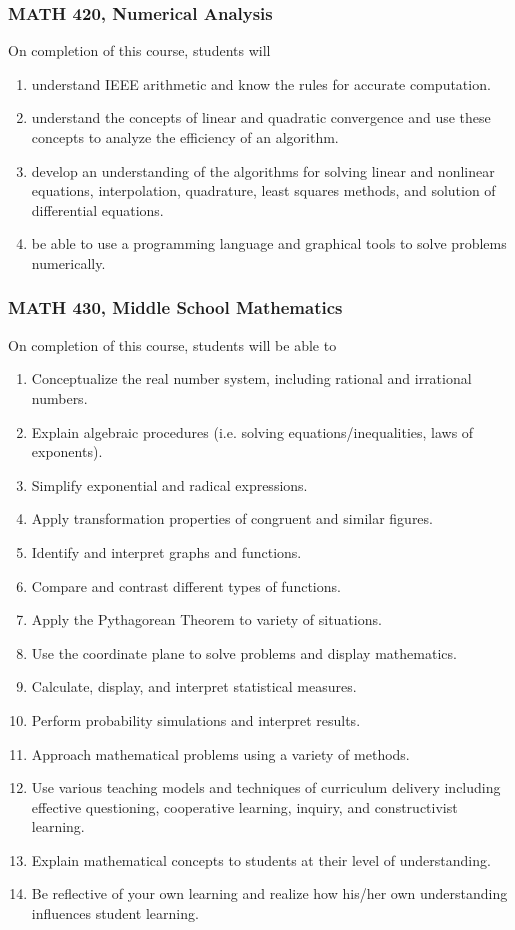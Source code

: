 \documentclass[11pt]{article}
\newenvironment{alphalist}{
\begin{enumerate}[label=(\arabic*),widest=107 ,leftmargin=25pt, itemsep=0pt]}
{\end{enumerate}}
\begin{document}
\subsubsection{MATH 420, Numerical Analysis}

On completion of this course, students will
\begin{alphalist}
    \item understand IEEE arithmetic and know the rules for accurate computation.
    \item understand the concepts of linear and quadratic convergence and use these concepts to analyze 
        the efficiency of an algorithm.
    \item develop an understanding of the algorithms for solving linear and nonlinear equations, interpolation, 
       quadrature, least squares methods, and solution of differential equations.
    \item be able to use a programming language and graphical tools to solve problems numerically.
\end{alphalist}

\subsubsection{MATH 430,  Middle School Mathematics}

On completion of this course, students will be able to 
\begin{alphalist}
\item Conceptualize the real number system, including rational and irrational numbers. 
\item Explain algebraic procedures (i.e. solving equations/inequalities, laws of exponents). 
\item Simplify exponential and radical expressions. 
\item Apply transformation properties of congruent and similar figures. 
\item Identify and interpret graphs and functions. 
\item Compare and contrast different types of functions. 
\item Apply the Pythagorean Theorem to variety of situations. 
\item Use the coordinate plane to solve problems and display mathematics. 
\item Calculate, display, and interpret statistical measures. 
\item Perform probability simulations and interpret results. 
\item Approach mathematical problems using a variety of methods. 
\item Use various teaching models and techniques of curriculum delivery including effective questioning, cooperative learning, inquiry, and constructivist learning. 
\item Explain mathematical concepts to students at their level of understanding. 
\item Be reflective of your own learning and realize how his/her own understanding influences student learning.
\end{alphalist}
\end{document}
